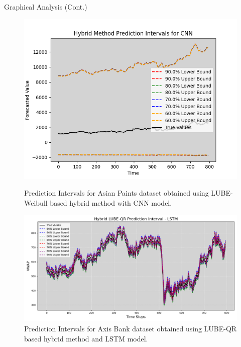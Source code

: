 \documentclass[xcolor=dvipsnames,aspectratio=169]{beamer}
\begin{document}
\begin{frame}{Graphical Analysis (Cont.)}

\begin{figure}
    \centering
    \begin{minipage}[b]{0.45\linewidth}
        \centering
        \includegraphics[width=\linewidth]{CNN_hybrid_method_plot_AsianPaint_Method2.png}
        \caption{Prediction Intervals for Asian Paints dataset obtained using LUBE-Weibull based hybrid method with CNN model.}
        \label{fig:asianpaints}
    \end{minipage}
    \hfill
    \begin{minipage}[b]{0.46\linewidth}
        \centering
        \includegraphics[width=\linewidth]{Hybrid_LUBE_QR_AllConfidence_axisbank_LSTM.png}
        \caption{Prediction Intervals for Axis Bank dataset obtained using LUBE-QR based hybrid method and LSTM model.}
        \label{fig:adaniports}
    \end{minipage}
\end{figure}

\end{frame}
\end{document}
